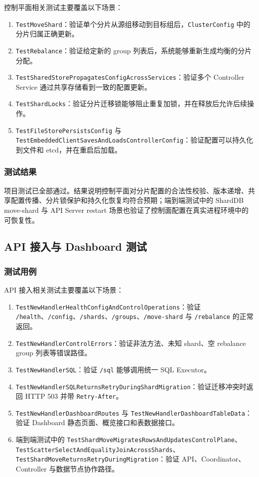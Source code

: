 \documentclass[UTF8,a4paper,12pt]{ctexart}
\begin{document}
控制平面相关测试主要覆盖以下场景：
\begin{enumerate}
  \item \texttt{TestMoveShard}：验证单个分片从源组移动到目标组后，\texttt{ClusterConfig} 中的分片归属正确更新。
  \item \texttt{TestRebalance}：验证给定新的 group 列表后，系统能够重新生成均衡的分片分配。
  \item \texttt{TestSharedStorePropagatesConfigAcrossServices}：验证多个 Controller Service 通过共享存储看到一致的配置更新。
  \item \texttt{TestShardLocks}：验证分片迁移锁能够阻止重复加锁，并在释放后允许后续操作。
  \item \texttt{TestFileStorePersistsConfig} 与 \texttt{TestEmbeddedClientSavesAndLoadsControllerConfig}：验证配置可以持久化到文件和 etcd，并在重启后加载。
\end{enumerate}

\subsubsection{测试结果}

项目测试已全部通过。结果说明控制平面对分片配置的合法性校验、版本递增、共享配置传播、分片锁保护和持久化恢复均符合预期；端到端测试中的 ShardDB move-shard 与 API Server restart 场景也验证了控制面配置在真实进程环境中的可恢复性。

\subsection{API 接入与 Dashboard 测试}

\subsubsection{测试用例}

API 接入相关测试主要覆盖以下场景：
\begin{enumerate}
  \item \texttt{TestNewHandlerHealthConfigAndControlOperations}：验证 \texttt{/health}、\texttt{/config}、\texttt{/shards}、\texttt{/groups}、\texttt{/move-shard} 与 \texttt{/rebalance} 的正常返回。
  \item \texttt{TestNewHandlerControlErrors}：验证非法方法、未知 shard、空 rebalance group 列表等错误路径。
  \item \texttt{TestNewHandlerSQL}：验证 \texttt{/sql} 能够调用统一 SQL Executor。
  \item \texttt{TestNewHandlerSQLReturnsRetryDuringShardMigration}：验证迁移冲突时返回 HTTP 503 并带 \texttt{Retry-After}。
  \item \texttt{TestNewHandlerDashboardRoutes} 与 \texttt{TestNewHandlerDashboardTableData}：验证 Dashboard 静态页面、概览接口和表数据接口。
  \item 端到端测试中的 \texttt{TestShardMoveMigratesRowsAndUpdatesControlPlane}、\texttt{TestScatterSelectAndEqualityJoinAcrossShards}、\texttt{TestShardMoveReturnsRetryDuringMigration}：验证 API、Coordinator、Controller 与数据节点协作路径。
\end{enumerate}
\end{document}
